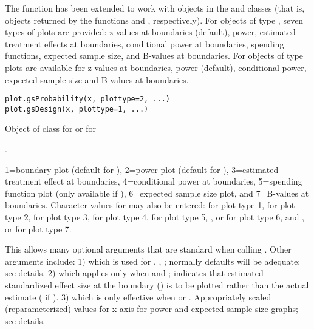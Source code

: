 \begin{Description}\relax
The  function has been extended to work with objects in the 
and  classes (that is, objects returned by the functions  and
, respectively). 
For objects of type , seven types of plots are provided: z-values at boundaries (default), power, 
estimated treatment effects at boundaries, 
conditional power at boundaries, spending functions, expected sample size, and B-values at boundaries.
For objects of type  plots are available for z-values at boundaries, power (default), conditional power,
expected sample size and B-values at boundaries.
\end{Description}
\begin{Usage}
\begin{verbatim}
plot.gsProbability(x, plottype=2, ...)
plot.gsDesign(x, plottype=1, ...)
\end{verbatim}
\end{Usage}
\begin{Arguments}
\begin{ldescription}
\item[\code{x}] Object of class  for  or  for

.
\item[\code{plottype}] 1=boundary plot (default for ), 
2=power plot (default for ), 
3=estimated treatment effect at boundaries, 
4=conditional power at boundaries, 
5=spending function plot 
(only available if ), 
6=expected sample size plot, and 
7=B-values at boundaries. 
Character values for  may also be entered:  for plot
type 1, for plot type 2,  for plot type 3,
 for plot type 4,  for plot type 5, , 
 or  for plot type 6, and ,  or 
 for plot type 7.
\item[\code{...}] This allows many optional arguments that are standard when calling .
Other arguments include: 
1)  which is used for , , ; normally defaults will be adequate; see details. 
2)  which applies only when  and ; indicates that estimated standardized effect size
at the boundary () is to be plotted rather than the actual estimate ( if ).
3)  which is only effective when  or . Appropriately scaled (reparameterized) values 
for x-axis for power and expected sample size graphs; see details.
\end{ldescription}
\end{Arguments}
